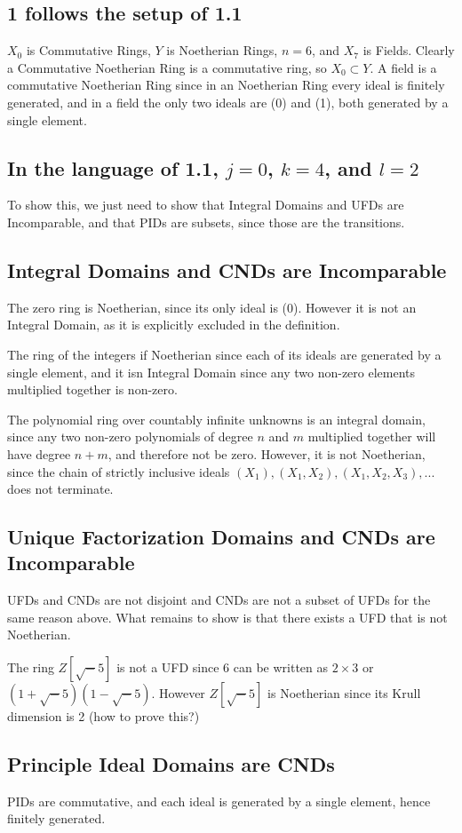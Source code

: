 \documentclass{article}
\begin{document}
\subsection{1 follows the setup of 1.1}

$X_0$ is Commutative Rings, $Y$ is Noetherian Rings, $n=6$, and $X_7$ is Fields. Clearly a Commutative Noetherian Ring is a commutative ring, so $X_0 \subset Y$. A field is a commutative Noetherian Ring since in an Noetherian Ring every ideal is finitely generated, and in a field the only two ideals are (0) and (1), both generated by a single element.

\subsection{In the language of 1.1, $j=0$, $k=4$, and $l=2$}

To show this, we just need to show that Integral Domains and UFDs are Incomparable, and that PIDs are subsets, since those are the transitions.

\subsection{Integral Domains and CNDs are Incomparable}

The zero ring is Noetherian, since its only ideal is (0). However it is not an Integral Domain, as it is explicitly excluded in the definition.

The ring of the integers if Noetherian since each of its ideals are generated by a single element, and it isn Integral Domain since any two non-zero elements multiplied together is non-zero.

The polynomial ring over countably infinite unknowns is an integral domain, since any two non-zero polynomials of degree $n$ and $m$ multiplied together will have degree $n+m$, and therefore not be zero. However, it is not Noetherian, since the chain of strictly inclusive ideals $(X_1), (X_1, X_2), (X_1, X_2, X_3), ... $ does not terminate.

\subsection{Unique Factorization Domains and CNDs are Incomparable}

UFDs and CNDs are not disjoint and CNDs are not a subset of UFDs for the same reason above. What remains to show is that there exists a UFD that is not Noetherian.

The ring $Z[\sqrt -5]$ is not a UFD since 6 can be written as $2 \times 3$ or $(1+ \sqrt -5)(1- \sqrt -5)$. However $Z[\sqrt -5]$ is Noetherian since its Krull dimension is 2 (how to prove this?)


\subsection{Principle Ideal Domains are CNDs}

PIDs are commutative, and each ideal is generated by a single element, hence finitely generated.
\end{document}
